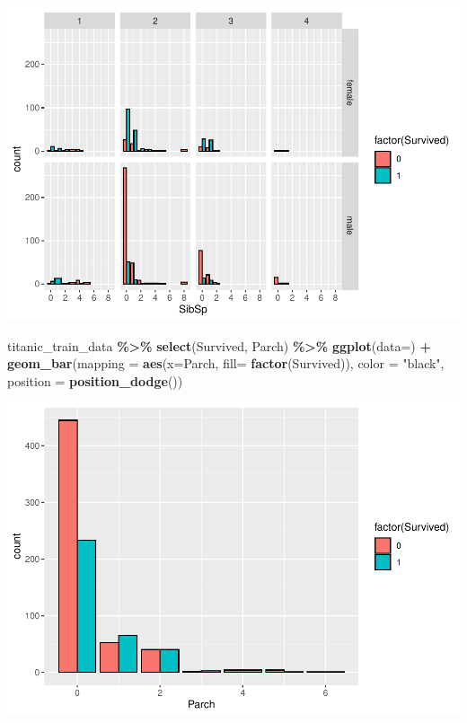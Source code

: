 \documentclass[
]{article}
\newenvironment{Shaded}{\begin{snugshade}}{\end{snugshade}}
\newcommand{\AttributeTok}[1]{\textcolor[rgb]{0.13,0.29,0.53}{#1}}
\newcommand{\FunctionTok}[1]{\textcolor[rgb]{0.13,0.29,0.53}{\textbf{#1}}}
\newcommand{\NormalTok}[1]{#1}
\newcommand{\SpecialCharTok}[1]{\textcolor[rgb]{0.81,0.36,0.00}{\textbf{#1}}}
\newcommand{\StringTok}[1]{\textcolor[rgb]{0.31,0.60,0.02}{#1}}
\begin{document}
\includegraphics{Titanic-Documentation_files/figure-latex/unnamed-chunk-32-1.pdf}

\begin{Shaded}
\begin{Highlighting}[]
\NormalTok{titanic\_train\_data }\SpecialCharTok{\%\textgreater{}\%}
  \FunctionTok{select}\NormalTok{(Survived, Parch) }\SpecialCharTok{\%\textgreater{}\%}
  \FunctionTok{ggplot}\NormalTok{(}\AttributeTok{data=}\NormalTok{) }\SpecialCharTok{+} 
  \FunctionTok{geom\_bar}\NormalTok{(}\AttributeTok{mapping =}  \FunctionTok{aes}\NormalTok{(}\AttributeTok{x=}\NormalTok{Parch, }\AttributeTok{fill=} \FunctionTok{factor}\NormalTok{(Survived)), }\AttributeTok{color =} \StringTok{"black"}\NormalTok{, }\AttributeTok{position =} \FunctionTok{position\_dodge}\NormalTok{())}
\end{Highlighting}
\end{Shaded}

\includegraphics{Titanic-Documentation_files/figure-latex/unnamed-chunk-33-1.pdf}
\end{document}
